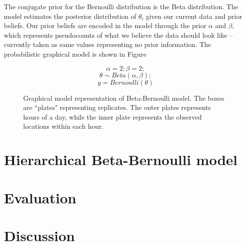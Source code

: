 The conjugate prior for the Bernoulli distribution is the Beta distribution. The model estimates the posterior distribution of $\theta_i$ given our current data and prior beliefs. Our prior beliefs are encoded in the model through the prior $\alpha$ and $\beta$, which represents pseudocounts of what we believe the data should look like – currently taken as same values representing no prior information. The probabilistic graphical model is shown in Figure \cite{bbm}


\noindent
\begin{figure}[htp]

\begin{minipage}{0.3\textwidth}
\centering


\end{minipage}%
\begin{minipage}{0.7\textwidth}

\begin{equation*}
	\alpha = 2 ; \beta = 2;
\end{equation*}
\begin{equation*}
	\theta \sim Beta(\alpha, \beta);
\end{equation*}
\begin{equation*}
	y = Bernoulli(\theta)
\end{equation*}
\end{minipage}
\caption{Graphical model representation of Beta-Bernoulli model. The boxes are ``plates" representing replicates. The outer plates represents hours of a day, while the inner plate represents the observed locations within each hour.}
\label{dcm}
\end{figure}

\section{Hierarchical Beta-Bernoulli model}

\section{Evaluation}

\section{Discussion}